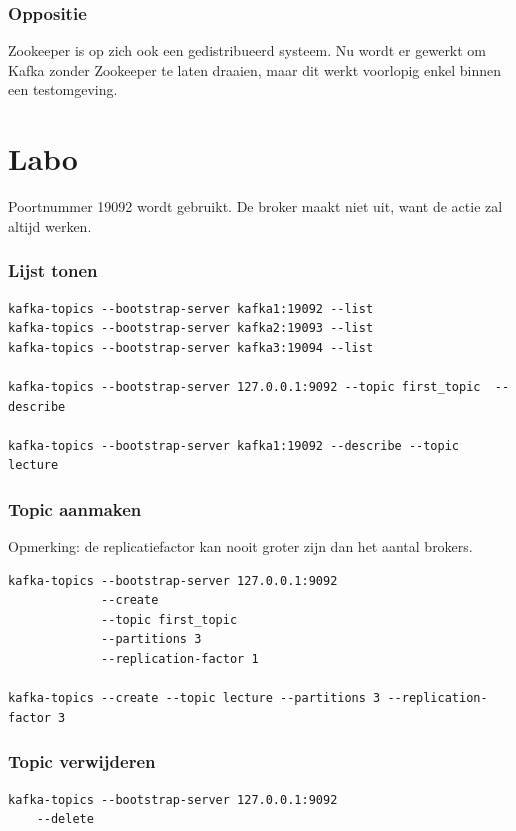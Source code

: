 \documentclass[a4paper,10pt,twoside]{report}
\begin{document}
\subsubsection{Oppositie}

Zookeeper is op zich ook een gedistribueerd systeem. Nu wordt er gewerkt om Kafka zonder Zookeeper te laten draaien, maar dit werkt voorlopig enkel binnen een testomgeving.

\section{Labo}

Poortnummer 19092 wordt gebruikt. De broker maakt niet uit, want de actie zal altijd werken.

\subsubsection{Lijst tonen}

\begin{lstlisting}[language=CLI-kafka]
kafka-topics --bootstrap-server kafka1:19092 --list
kafka-topics --bootstrap-server kafka2:19093 --list
kafka-topics --bootstrap-server kafka3:19094 --list

kafka-topics --bootstrap-server 127.0.0.1:9092 --topic first_topic  --describe

kafka-topics --bootstrap-server kafka1:19092 --describe --topic lecture
\end{lstlisting}

\subsubsection{Topic aanmaken}
Opmerking: de replicatiefactor kan nooit groter zijn dan het aantal brokers.
\begin{lstlisting}[language=CLI-kafka]
kafka-topics --bootstrap-server 127.0.0.1:9092
			 --create
			 --topic first_topic
			 --partitions 3
			 --replication-factor 1
			 
kafka-topics --create --topic lecture --partitions 3 --replication-factor 3
\end{lstlisting}


\subsubsection{Topic verwijderen}

\begin{lstlisting}[language=CLI-kafka]
kafka-topics --bootstrap-server 127.0.0.1:9092
	--delete
\end{lstlisting}
\end{document}
